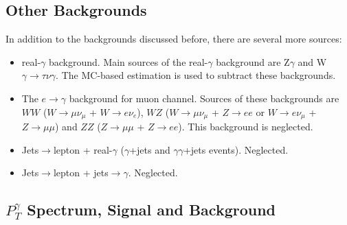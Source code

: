 \subsection{Other Backgrounds}

In addition to the backgrounds discussed before, there are several more sources:
\begin{itemize}
   \item real-$\gamma$ background. Main sources of the real-$\gamma$ background are Z$\gamma$ and W$\gamma \rightarrow \tau \nu \gamma$. The MC-based estimation is used to subtract these backgrounds.
   \item The $e \rightarrow \gamma$ background for muon channel. Sources of these backgrounds are $WW$ ($W \rightarrow \mu\nu_{\mu}$ + $W \rightarrow e\nu_e$), $WZ$ ($W \rightarrow \mu\nu_{\mu}$ + $Z \rightarrow ee$ or $W \rightarrow e\nu_{\mu}$ + $Z \rightarrow \mu\mu$) and $ZZ$ ($Z \rightarrow \mu\mu$ + $Z \rightarrow ee$). This background is neglected.
   \item Jets$ \rightarrow $lepton + real-$\gamma$ ($\gamma$+jets and $\gamma\gamma$+jets events). Neglected.
   \item Jets$ \rightarrow $lepton + jets$ \rightarrow \gamma$. Neglected. 
\end{itemize}



\subsection{$P_T^{\gamma}$ Spectrum, Signal and Background}

